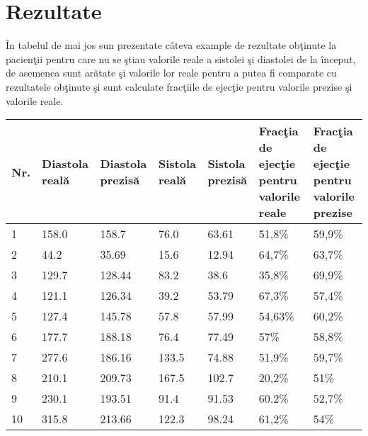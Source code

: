 \section{Rezultate}

\^{I}n tabelul de mai jos sun prezentate c\^{a}teva example de rezultate ob\c{t}inute la pacien\c{t}ii pentru care nu se \c{s}tiau valorile reale a sistolei \c{s}i diastolei de la \^{i}nceput, de asemenea sunt ar\u{a}tate \c{s}i valorile lor reale pentru a putea fi comparate cu rezultatele ob\c{t}inute \c{s}i sunt calculate frac\c{t}iile de ejec\c{t}ie pentru valorile prezise \c{s}i valorile reale.

\begin{center}
 \begin{longtable}{|p{0.5cm}|p{2cm}|p{2cm}|p{2cm}|p{2cm}|p{2cm}|p{2cm}|} 
 \hline
 Nr. & Diastola real\u{a} & Diastola prezis\u{a} & Sistola real\u{a} & Sistola prezis\u{a} & Frac\c{t}ia de ejec\c{t}ie pentru valorile reale & Frac\c{t}ia de ejec\c{t}ie pentru valorile prezise  \\ [0.5ex] 
 \hline\hline
 1 &  158.0 & 158.7 & 76.0 & 63.61 & 51,8\% & 59,9\% \\
 \hline
 2 &  44.2 & 35.69 & 15.6 & 12.94 & 64,7\% & 63,7\% \\ 
 \hline
 3 &  129.7 & 128.44 & 83.2 & 38.6 & 35,8\% & 69,9\% \\
 \hline
 4 &  121.1 & 126.34 & 39.2 & 53.79 & 67,3\% & 57,4\% \\
 \hline
 5 &  127.4 & 145.78 & 57.8 & 57.99 & 54,63\% & 60,2\% \\
 \hline
 6 &  177.7 & 188.18 & 76.4 & 77.49 & 57\% & 58,8\% \\
 \hline
 7 &  277.6 & 186.16 & 133.5 & 74.88 & 51,9\% & 59,7\% \\
 \hline
 8 &  210.1 & 209.73 & 167.5 & 102.7 & 20,2\% & 51\% \\
 \hline
 9 &  230.1 & 193.51 & 91.4 & 91.53 & 60.2\% & 52,7\% \\
 \hline
 10 &  315.8 & 213.66 & 122.3 & 98.24 & 61,2\% & 54\% \\
 \hline
\end{longtable}
\end{center}

